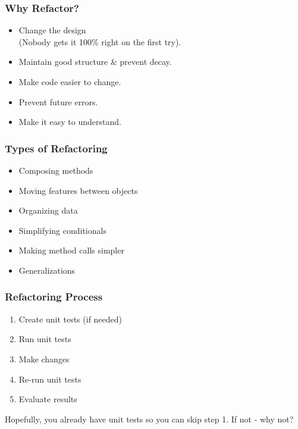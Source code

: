 \begin{frame}
\frametitle{Why Refactor?}
\begin{changemargin}{1cm}

\begin{itemize}
	\item Change the design\\
	 \quad(Nobody gets it 100\% right on the first try).
	\item Maintain good structure \& prevent decay.
	\item Make code easier to change.
	\item Prevent future errors.
	\item Make it easy to understand.
\end{itemize}

\end{changemargin}
\end{frame}

\begin{frame}
\frametitle{Types of Refactoring}
\begin{changemargin}{1cm}
\begin{itemize}
	\item Composing methods
	\item Moving features between objects
	\item Organizing data
	\item Simplifying conditionals
	\item Making method calls simpler
	\item Generalizations
\end{itemize}

\end{changemargin}
\end{frame}


\begin{frame}
\frametitle{Refactoring Process}
\begin{changemargin}{1cm}

\begin{enumerate}
	\item Create unit tests (if needed)
	\item Run unit tests
	\item Make changes
	\item Re-run unit tests
	\item Evaluate results
\end{enumerate}

Hopefully, you already have unit tests so you can skip step 1. If not - why not?

\end{changemargin}
\end{frame}



